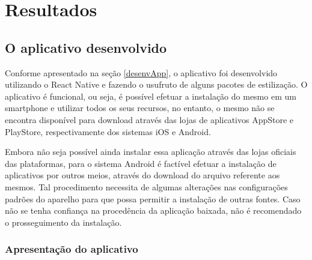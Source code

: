 \chapter{Resultados}

\section{O aplicativo desenvolvido}
\label{sec-app-desenvolvido}

Conforme apresentado na seção \ref{desenvApp}, o aplicativo foi desenvolvido utilizando o React Native e fazendo o usufruto de alguns pacotes de estilização. O aplicativo é funcional, ou seja, é possível efetuar a instalação do mesmo em um smartphone e utilizar todos os seus recursos, no entanto, o mesmo não se encontra disponível para download através das lojas de aplicativos AppStore e PlayStore, respectivamente dos sistemas iOS e Android.

Embora não seja possível ainda instalar essa aplicação através das lojas oficiais das plataformas, para o sistema Android é factível efetuar a instalação de aplicativos por outros meios, através do download do arquivo referente aos mesmos. Tal procedimento necessita de algumas alterações nas configurações padrões do aparelho para que possa permitir a instalação de outras fontes. Caso não se tenha confiança na procedência da aplicação baixada, não é recomendado o prosseguimento da instalação.

\newpage
\subsection{Apresentação do aplicativo}

